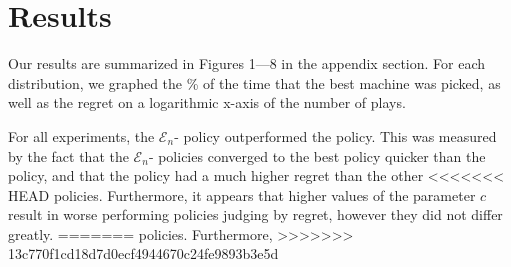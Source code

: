 
\section{Results}
\label{sec:results}

Our results are summarized in Figures 1---8 in the appendix
section. For each distribution, we graphed the \% of the time that the
best machine was picked, as well as the regret on a logarithmic x-axis
of the number of plays.

For all experiments, the $\mathcal{E}_n$- policy
outperformed the  policy. This was measured by the fact
that the $\mathcal{E}_n$- policies converged to the
best policy quicker than the  policy, and that the
 policy had a much higher regret than the other
<<<<<<< HEAD
policies. Furthermore, it appears that higher values of the parameter
$c$ result in worse performing policies judging by regret, however
they did not differ greatly.
=======
policies. Furthermore, 
>>>>>>> 13c770f1cd18d7d0ecf4944670c24fe9893b3e5d
